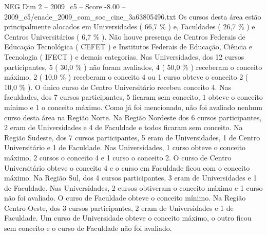 \begin{textsample}{NEG Dim 2 – 2009\_c5 – Score -8.00 – 2009\_c5/enade\_2009\_com\_soc\_cine\_3a63805496.txt}
Os cursos desta área estão principalmente alocados em Universidades ( 66,7 \% ) e, Faculdades ( 26,7 \% ) e Centros Universitários ( 6,7 \% ).
Não houve presença de Centros Federais de Educação Tecnológica ( CEFET ) e Institutos Federais de Educação, Ciência e Tecnologia ( IFECT ) e demais categorias.
Nas Universidades, dos 12 cursos participantes, 5 ( 30,0 \% ) não foram avaliados, 4 ( 50,0 \% ) receberam o conceito máximo, 2 ( 10,0 \% ) receberam o conceito 4 ou 1 curso obteve o conceito 2 ( 10,0 \% ).
O único curso de Centro Universitário recebeu conceito 4.
Nas faculdades, dos 7 cursos participantes, 5 ficaram sem conceito, 1 obteve o conceito mínimo e 1 o conceito máximo.
Como já foi mencionado, não foi avaliado nenhum curso desta área na Região Norte.
Na Região Nordeste dos 6 cursos participantes, 2 eram de Universidades e 4 de Faculdade e todos ficaram sem conceito.
Na Região Sudeste, dos 7 cursos participantes, 5 eram de Universidades, 1 de Centro Universitário e 1 de Faculdade.
Nas Universidades, 1 curso obteve o conceito máximo, 2 cursos o conceito 4 e 1 curso o conceito 2.
O curso de Centro Universitário obteve o conceito 4 e o curso em Faculdade ficou com o conceito máximo.
Na Região Sul, dos 4 cursos participantes, 3 eram de Universidades e 1 de Faculdade.
Nas Universidades, 2 cursos obtiveram o conceito máximo e 1 curso não foi avaliado.
O curso de Faculdade obteve o conceito mínimo.
Na Região Centro-Oeste, dos 3 cursos participantes, 2 eram de Universidades e 1 de Faculdade.
Um curso de Universidade obteve o conceito máximo, o outro ficou sem conceito e o curso de Faculdade não foi avaliado.

\end{textsample}
